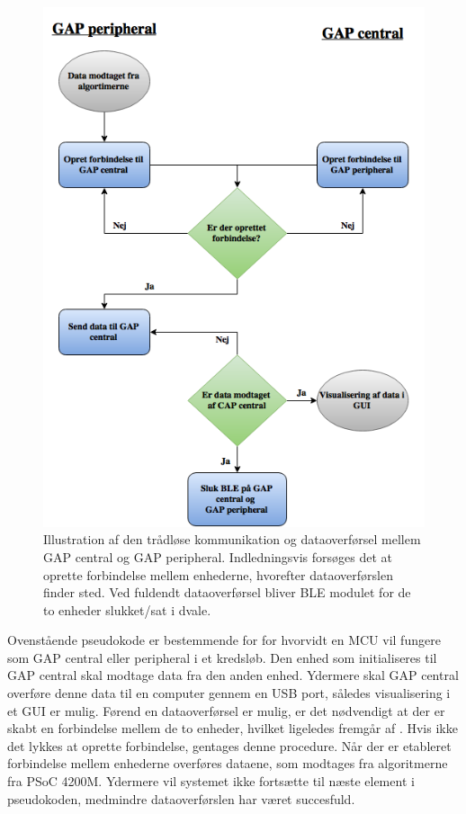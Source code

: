 \begin{figure}[H]
	\centering
	\includegraphics[scale=0.5]{figures/cDesign/blue_pseudo.png}
	\caption{Illustration af den trådløse kommunikation og dataoverførsel mellem GAP central og GAP peripheral. Indledningsvis forsøges det at oprette forbindelse mellem enhederne, hvorefter dataoverførslen finder sted. Ved fuldendt dataoverførsel bliver BLE modulet for de to enheder slukket/sat i dvale.}
	\label{fig:blue_pseudo}
\end{figure}
Ovenstående pseudokode er bestemmende for  for hvorvidt en MCU vil fungere som GAP central eller peripheral i et kredsløb. Den enhed som initialiseres til GAP central skal modtage data fra den anden enhed. Ydermere skal GAP central overføre denne data til en computer gennem en USB port, således visualisering i et GUI er mulig. \newline
Førend en dataoverførsel er mulig, er det nødvendigt at der er skabt en forbindelse mellem de to enheder, hvilket ligeledes fremgår af . Hvis ikke det lykkes at oprette forbindelse, gentages denne procedure. Når der er etableret forbindelse mellem enhederne overføres dataene, som modtages fra algoritmerne fra PSoC 4200M. Ydermere vil systemet ikke fortsætte til næste element i pseudokoden, medmindre dataoverførslen har været succesfuld.  

